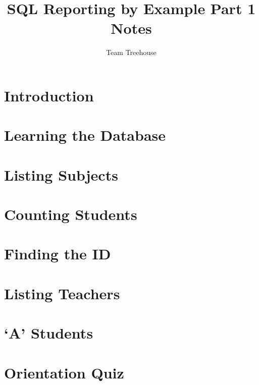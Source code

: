 \documentclass[12pt]{article}
\begin{document}
\title{SQL Reporting by Example Part 1 Notes}
\author{Team Treehouse}
\maketitle

\bigskip

\section{Introduction}

\bigskip

\section{Learning the Database}

\bigskip

\section{Listing Subjects}

\bigskip

\section{Counting Students}

\bigskip

\section{Finding the ID}

\bigskip

\section{Listing Teachers}

\bigskip

\section{`A' Students}

\bigskip

\section{Orientation Quiz}

\bigskip
\end{document}
